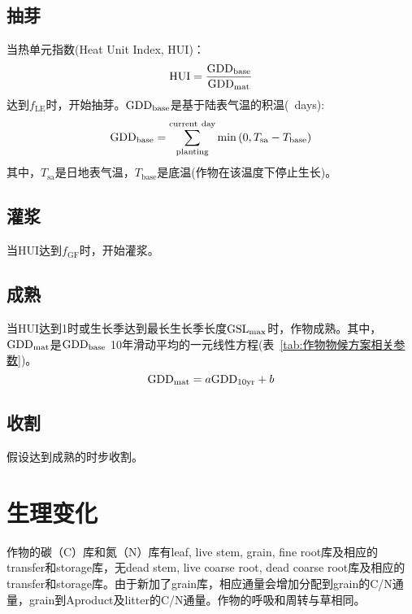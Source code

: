 \subsection{抽芽}
当热单元指数(Heat Unit Index, ${\mathrm {HUI}}$)：
\begin{equation}\label{HUI}
  {\mathrm {HUI}}=\frac{{\rm GDD}_{\mathrm{base}}}{{\rm GDD}_{\mathrm{mat}}}
\end{equation}
达到$f_{\mathrm{LE}}$时，开始抽芽。${\rm GDD}_{\mathrm{base}}$是基于陆表气温的积温(\textcelsius\ days):
\begin{equation}
  {\rm GDD}_{\mathrm{ {base }}}=\sum_{\mathrm{planting}}^{\rm current\ day} \min \left(0, T_{\mathrm{sa}}-T_{\mathrm{base}}\right)
\end{equation}
其中，$T_{\mathrm{sa}}$是日地表气温，$T_{\mathrm{base}}$是底温(作物在该温度下停止生长)。

\subsection{灌浆}
当${\mathrm {HUI}}$达到$f_{\mathrm{GF}}$时，开始灌浆。

\subsection{成熟}
当${\mathrm {HUI}}$达到1时或生长季达到最长生长季长度${\rm GSL}_{\mathrm{max}}$时，作物成熟。其中，${\rm GDD}_{\mathrm{mat}}$是${\rm GDD}_{\mathrm{base}}$
10年滑动平均的一元线性方程(表~\ref{tab:作物物候方案相关参数})。
\begin{equation}
  {\rm GDD}_{\mathrm{mat}}=a {\rm GDD}_{\rm 10yr}+b
\end{equation}

\subsection{收割}
假设达到成熟的时步收割。


\section{生理变化}
作物的碳（C）库和氮（N）库有leaf, live stem, grain, fine root库及相应的transfer和storage库，无dead stem, live coarse root, dead coarse root库及相应的transfer和storage库。由于新加了grain库，相应通量会增加分配到grain的C/N通量，grain到Aproduct及litter的C/N通量。作物的呼吸和周转与草相同。

